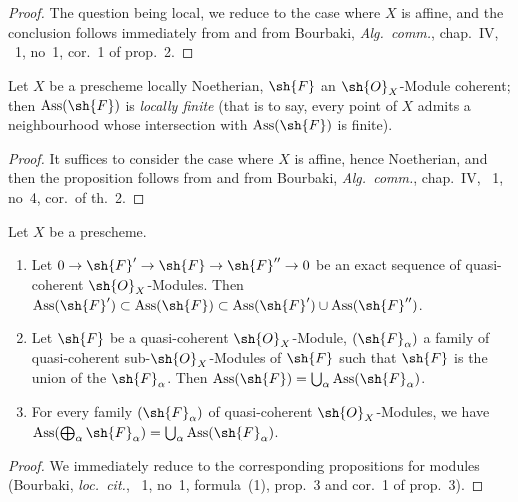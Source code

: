 \begin{proof}
The question being local, we reduce to the case where $X$ is affine, and the conclusion follows immediately from  and from Bourbaki, \emph{Alg.\ comm.}, chap.~IV, \textsection~1, no~1, cor.~1 of prop.~2.
\end{proof}

\begin{proposition}[3.1.6]
\label{IV.3.1.6}
Let $X$ be a prescheme locally Noetherian, $\sh{F}$ an $\sh{O}_X$-Module coherent; then $\operatorname{Ass}(\sh{F})$ is \emph{locally finite} (that is to say, every point of $X$ admits a neighbourhood whose intersection with $\operatorname{Ass}(\sh{F})$ is finite).
\end{proposition}

\begin{proof}
It suffices to consider the case where $X$ is affine, hence Noetherian, and then the proposition follows from  and from Bourbaki, \emph{Alg.\ comm.}, chap.~IV, \textsection~1, no~4, cor.\ of th.~2.
\end{proof}

\begin{proposition}[3.1.7]
\label{IV.3.1.7}
Let $X$ be a prescheme.
\begin{enumerate}[label=(\roman*)]
  \item Let $0\to\sh{F}'\to\sh{F}\to\sh{F}''\to 0$ be an exact sequence of quasi-coherent $\sh{O}_X$-Modules.
  Then $\operatorname{Ass}(\sh{F}')\subset\operatorname{Ass}(\sh{F})\subset\operatorname{Ass}(\sh{F}')\cup\operatorname{Ass}(\sh{F}'')$.
  \item Let $\sh{F}$ be a quasi-coherent $\sh{O}_X$-Module, $(\sh{F}_\alpha)$ a family of quasi-coherent sub-$\sh{O}_X$-Modules of $\sh{F}$ such that $\sh{F}$ is the union of the $\sh{F}_\alpha$.
  Then $\operatorname{Ass}(\sh{F})=\bigcup_\alpha\operatorname{Ass}(\sh{F}_\alpha)$.
  \item For every family $(\sh{F}_\alpha)$ of quasi-coherent $\sh{O}_X$-Modules, we have $\operatorname{Ass}(\bigoplus_\alpha\sh{F}_\alpha)=\bigcup_\alpha\operatorname{Ass}(\sh{F}_\alpha)$.
\end{enumerate}
\end{proposition}

\begin{proof}
We immediately reduce to the corresponding propositions for modules (Bourbaki, \emph{loc.\ cit.}, \textsection~1, no~1, formula~(1), prop.~3 and cor.~1 of prop.~3).
\end{proof}


